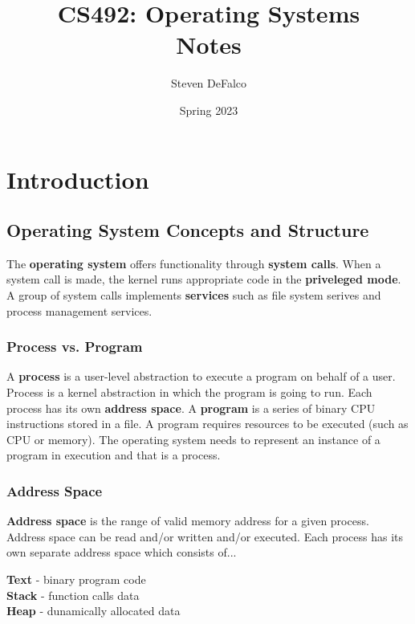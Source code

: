 \documentclass{article}
\title{CS492: Operating Systems \\ Notes}
\author{Steven DeFalco}
\date{Spring 2023}
\newcommand{\bold}[1]{\textbf{#1}}
\begin{document}
\maketitle

\tableofcontents

\newpage

\section{Introduction}

\subsection{Operating System Concepts and Structure}

    The \textbf{operating system} offers functionality through \textbf{system calls}. When a system call is made, the kernel runs appropriate code in the \textbf{priveleged mode}. \\

    \noindent A group of system calls implements \textbf{services} such as file system serives and process management services. \\

    \subsubsection{Process vs. Program}

    \noindent A \textbf{process} is a user-level abstraction to execute a program on behalf of a user. Process is a kernel abstraction in which the program is going to run. Each process has its own \textbf{address space}. A \textbf{program} is a series of binary CPU instructions stored in a file. A program requires resources to be executed (such as CPU or memory). The operating system needs to represent an instance of a program in execution and that is a process. 

    \subsubsection{Address Space}

    \noindent \textbf{Address space} is the range of valid memory address for a given process. Address space can be read and/or written and/or executed. Each process has its own separate address space which consists of...
    
    \begin{center}
        \bold{Text} - binary program code \\

        \bold{Stack} - function calls data \\

        \bold{Heap} - dunamically allocated data \\
    \end{center}
\end{document}
